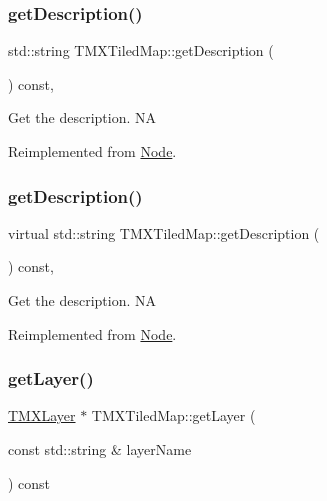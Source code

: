 \subsubsection{\texorpdfstring{get\+Description()}{getDescription()}\hspace{0.1cm}{\footnotesize\ttfamily [1/2]}}
{\footnotesize\ttfamily std\+::string T\+M\+X\+Tiled\+Map\+::get\+Description (\begin{DoxyParamCaption}{ }\end{DoxyParamCaption}) const\hspace{0.3cm}{\ttfamily [override]}, {\ttfamily [virtual]}}

Get the description.  NA 

Reimplemented from \hyperlink{classNode_a41710375a0d92a4ee54c39fe123b5912}{Node}.

\mbox{\label{classTMXTiledMap_a300398db77c8dcabafc6723eaaee67af}} 
\subsubsection{\texorpdfstring{get\+Description()}{getDescription()}\hspace{0.1cm}{\footnotesize\ttfamily [2/2]}}
{\footnotesize\ttfamily virtual std\+::string T\+M\+X\+Tiled\+Map\+::get\+Description (\begin{DoxyParamCaption}{ }\end{DoxyParamCaption}) const\hspace{0.3cm}{\ttfamily [override]}, {\ttfamily [virtual]}}

Get the description.  NA 

Reimplemented from \hyperlink{classNode_a41710375a0d92a4ee54c39fe123b5912}{Node}.

\mbox{\label{classTMXTiledMap_aff957f2716dd1f06bd8ce54b173c43e1}} 
\subsubsection{\texorpdfstring{get\+Layer()}{getLayer()}\hspace{0.1cm}{\footnotesize\ttfamily [1/2]}}
{\footnotesize\ttfamily \hyperlink{classTMXLayer}{T\+M\+X\+Layer} $\ast$ T\+M\+X\+Tiled\+Map\+::get\+Layer (\begin{DoxyParamCaption}\item[{const std\+::string \&}]{layer\+Name }\end{DoxyParamCaption}) const}


